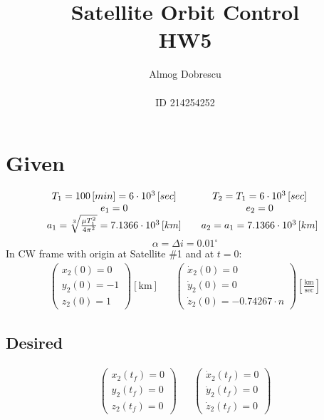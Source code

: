 \documentclass[11pt, a4paper]{article}
\title{Satellite Orbit Control \\ HW5}
\author{Almog Dobrescu\\\\ID 214254252}
\begin{document}
\maketitle

\thispagestyle{empty}
\newpage
\setcounter{page}{1}

\tableofcontents
\vfil
\listoffigures
\newpage

\section{Given}
\begin{equation*}
    \begin{matrix}
        T_1=100\left[min\right] = 6\cdot10^3\left[sec\right] && T_2 = T_1 = 6\cdot10^3\left[sec\right] \\
        e_1 = 0 && e_2 = 0 \\
        a_1 = \sqrt[3]{\frac{\mu T_1^2}{4\pi^2}} = 7.1366\cdot10^3\left[km\right] && a_2 = a_1 = 7.1366\cdot10^3\left[km\right]
    \end{matrix}\\
\end{equation*}
\begin{equation*}
    \alpha=\Delta i = 0.01^\circ
\end{equation*}
In CW frame with origin at Satellite \#1 and at $t=0$:
\begin{equation*}
    \begin{matrix}
    \begin{pmatrix}
        x_2(0)=0 \\ y_2(0)=-1 \\ z_2(0)=1
    \end{pmatrix}\left[\mathrm{km}\right] &&
    \begin{pmatrix}
        \dot{x}_2(0)=0 \\ \dot{y}_2(0) =0 \\ \dot{z}_2(0)=-0.74267\cdot n
    \end{pmatrix}\displaystyle\left[\frac{\mathrm{km}}{\mathrm{sec}}\right]
    \end{matrix}
\end{equation*}

\subsection{Desired}
\begin{equation*}
    \begin{matrix}
    \begin{pmatrix}
        x_2(t_f)=0 \\ y_2(t_f)=0 \\ z_2(t_f)=0
    \end{pmatrix} &&
    \begin{pmatrix}
        \dot{x}_2(t_f)=0 \\ \dot{y}_2(t_f)=0 \\ \dot{z}_2(t_f)=0
    \end{pmatrix}
    \end{matrix}
\end{equation*}
\end{document}
